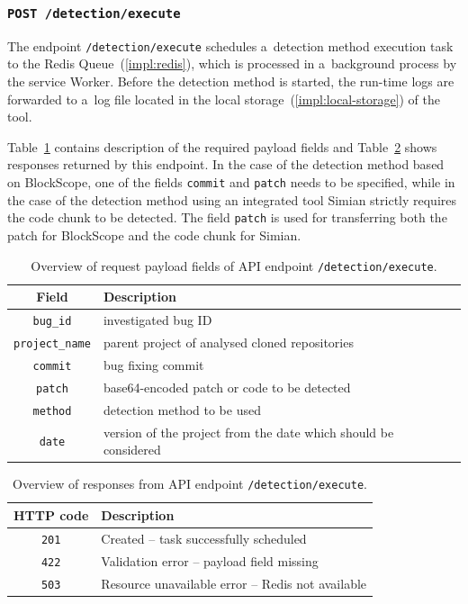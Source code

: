   \subsubsection*{\texttt{POST /detection/execute}}
  The endpoint \texttt{/detection/execute} schedules a~detection method execution task to the Redis Queue~(\ref{impl:redis}),
  which is processed in a~background process by the service Worker. Before the detection method is started, the run-time
  logs are forwarded to a~log file located in the local storage~(\ref{impl:local-storage}) of the tool.

  Table~\ref{tab:detection-execute-rq} contains description of the required payload fields and Table~\ref{tab:detection-execute-rs}
  shows responses returned by this endpoint. In the case of the detection method based on BlockScope, one of the fields
  \texttt{commit} and \texttt{patch} needs to be specified, while in the case of the detection method using an integrated tool Simian
  strictly requires the code chunk to be detected. The field \texttt{patch} is used for transferring both the patch for BlockScope
  and the code chunk for Simian.

  \begin{table}[h]
        \centering
        \begin{tabular}{|c|l|}
          \hline
            Field & Description \\
          \hline
            \texttt{bug\_id} & investigated bug ID \\
            \texttt{project\_name} & parent project of analysed cloned repositories \\
            \texttt{commit} & bug fixing commit \\
            \texttt{patch} & base64-encoded patch or code to be detected \\
            \texttt{method} & detection method to be used \\
            \texttt{date} & version of the project from the date which should be considered \\
          \hline
        \end{tabular}
        \caption{Overview of request payload fields of API endpoint \texttt{/detection/execute}.}
        \label{tab:detection-execute-rq}
    \end{table}

    \begin{table}[h!]
        \centering
        \begin{tabular}{|c|l|}
          \hline
            HTTP code & Description \\
          \hline
            \texttt{201} & Created -- task successfully scheduled \\
            \texttt{422} & Validation error -- payload field missing \\
            \texttt{503} & Resource unavailable error -- Redis not available \\
          \hline
        \end{tabular}
        \caption{Overview of responses from API endpoint \texttt{/detection/execute}.}
        \label{tab:detection-execute-rs}
    \end{table}

